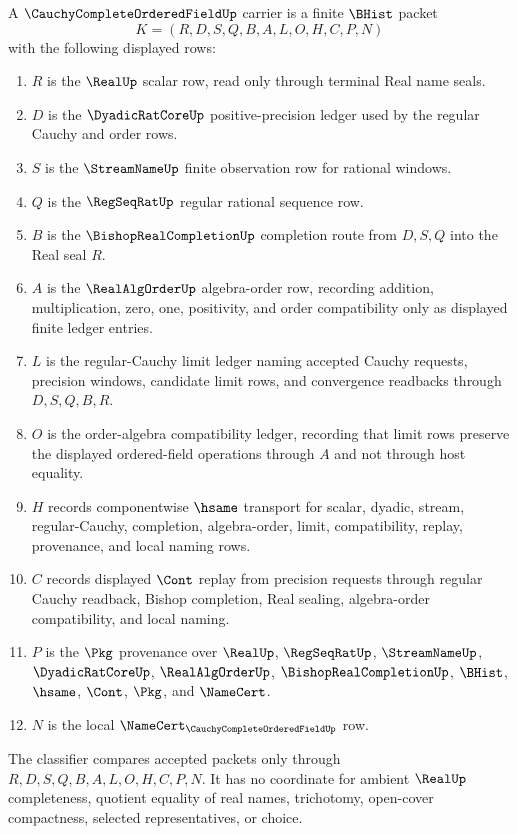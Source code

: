 \begin{definition}
\label{def:cauchy-complete-ordered-field-carrier}
A $\CauchyCompleteOrderedFieldUp$ carrier is a finite $\BHist$ packet
$$
K=(R,D,S,Q,B,A,L,O,H,C,P,N)
$$
with the following displayed rows:
\begin{enumerate}
\item $R$ is the $\RealUp$ scalar row, read only through terminal Real name seals.
\item $D$ is the $\DyadicRatCoreUp$ positive-precision ledger used by the regular Cauchy and order rows.
\item $S$ is the $\StreamNameUp$ finite observation row for rational windows.
\item $Q$ is the $\RegSeqRatUp$ regular rational sequence row.
\item $B$ is the $\BishopRealCompletionUp$ completion route from $D,S,Q$ into the Real seal $R$.
\item $A$ is the $\RealAlgOrderUp$ algebra-order row, recording addition, multiplication, zero, one, positivity, and order compatibility only as displayed finite ledger entries.
\item $L$ is the regular-Cauchy limit ledger naming accepted Cauchy requests, precision windows, candidate limit rows, and convergence readbacks through $D,S,Q,B,R$.
\item $O$ is the order-algebra compatibility ledger, recording that limit rows preserve the displayed ordered-field operations through $A$ and not through host equality.
\item $H$ records componentwise $\hsame$ transport for scalar, dyadic, stream, regular-Cauchy, completion, algebra-order, limit, compatibility, replay, provenance, and local naming rows.
\item $C$ records displayed $\Cont$ replay from precision requests through regular Cauchy readback, Bishop completion, Real sealing, algebra-order compatibility, and local naming.
\item $P$ is the $\Pkg$ provenance over $\RealUp$, $\RegSeqRatUp$, $\StreamNameUp$, $\DyadicRatCoreUp$, $\RealAlgOrderUp$, $\BishopRealCompletionUp$, $\BHist$, $\hsame$, $\Cont$, $\Pkg$, and $\NameCert$.
\item $N$ is the local $\NameCert_{\CauchyCompleteOrderedFieldUp}$ row.
\end{enumerate}
The classifier compares accepted packets only through $R,D,S,Q,B,A,L,O,H,C,P,N$. It has no coordinate for ambient $\RealUp$ completeness, quotient equality of real names, trichotomy, open-cover compactness, selected representatives, or choice.
\end{definition}

